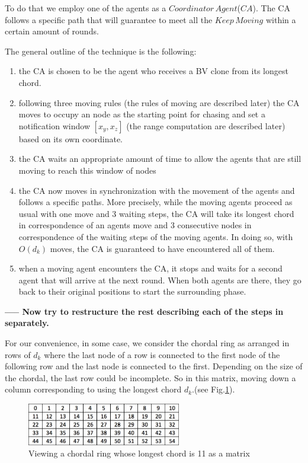 
To do that we employ one of the agents as a  $Coordinator\,Agent$($CA$). The CA follows a specific path that will guarantee to meet all the $Keep\,Moving$ within a certain amount of rounds.


The general outline of the technique is the following:
\begin{enumerate}
\item the CA is chosen to be the agent who receives a BV clone from its longest chord. %
\item following three moving rules (the rules of moving are described later) the CA moves to occupy an node as the starting point for chasing and set a notification window $[x_y,x_z]$ (the range computation are described later) based on its own coordinate. 
\item the CA waits an appropriate amount of time to allow the agents that are still moving to reach this window of nodes
\item the CA now moves in synchronization with the movement of the agents and follows a specific paths. 
More precisely, while the moving agents proceed as usual  with one move and 3 waiting steps, the CA will take its longest chord in correspondence of an agents move and 3 consecutive nodes in correspondence of the waiting steps of the moving agents. In doing so, with $O(d_k)$ moves, the CA is guaranteed to have encountered  all of them.
\item when a moving agent encounters the CA, it stops and waits for a second agent that will arrive at the next round. When both agents are there, they go back to their original positions to start the surrounding phase.
\end{enumerate}

{\bf  ----- Now try to restructure the rest describing each of the steps in separately. }

For our convenience, in some case, we consider the chordal ring as arranged in rows of $d_k$ where the last node of a row is connected to the first node of the following row and the last node is connected to the first. Depending on the size of the chordal, the last row could be incomplete. So in this matrix, moving down a column corresponding to using the longest chord $d_k$.(see Fig.\ref{fig:matrix}). 
\begin{figure}[H]
  \centering  
  \includegraphics[width=0.6\textwidth]{figures/matrix.png}
  \caption{Viewing a chordal ring whose longest chord is 11 as a matrix}\label{fig:matrix}
\end{figure}

